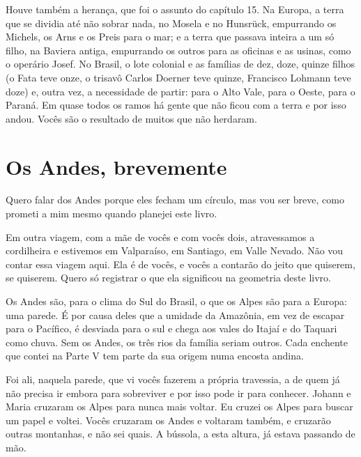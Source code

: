 \documentclass[
  brazilian,
  11pt,
  openany]{book}
\begin{document}
Houve também a herança, que foi o assunto do capítulo 15. Na Europa, a
terra que se dividia até não sobrar nada, no Mosela e no Hunsrück,
empurrando os Michels, os Arns e os Preis para o mar; e a terra que
passava inteira a um só filho, na Baviera antiga, empurrando os outros
para as oficinas e as usinas, como o operário Josef. No Brasil, o lote
colonial e as famílias de dez, doze, quinze filhos (o Fata teve onze, o
trisavô Carlos Doerner teve quinze, Francisco Lohmann teve doze) e,
outra vez, a necessidade de partir: para o Alto Vale, para o Oeste, para
o Paraná. Em quase todos os ramos há gente que não ficou com a terra e
por isso andou. Vocês são o resultado de muitos que não herdaram.

\section{Os Andes, brevemente}\label{os-andes-brevemente}

Quero falar dos Andes porque eles fecham um círculo, mas vou ser breve,
como prometi a mim mesmo quando planejei este livro.

Em outra viagem, com a mãe de vocês e com vocês dois, atravessamos a
cordilheira e estivemos em Valparaíso, em Santiago, em Valle Nevado. Não
vou contar essa viagem aqui. Ela é de vocês, e vocês a contarão do jeito
que quiserem, se quiserem. Quero só registrar o que ela significou na
geometria deste livro.

Os Andes são, para o clima do Sul do Brasil, o que os Alpes são para a
Europa: uma parede. É por causa deles que a umidade da Amazônia, em vez
de escapar para o Pacífico, é desviada para o sul e chega aos vales do
Itajaí e do Taquari como chuva. Sem os Andes, os três rios da família
seriam outros. Cada enchente que contei na Parte V tem parte da sua
origem numa encosta andina.

Foi ali, naquela parede, que vi vocês fazerem a própria travessia, a de
quem já não precisa ir embora para sobreviver e por isso pode ir para
conhecer. Johann e Maria cruzaram os Alpes para nunca mais voltar. Eu
cruzei os Alpes para buscar um papel e voltei. Vocês cruzaram os Andes e
voltaram também, e cruzarão outras montanhas, e não sei quais. A
bússola, a esta altura, já estava passando de mão.
\end{document}
